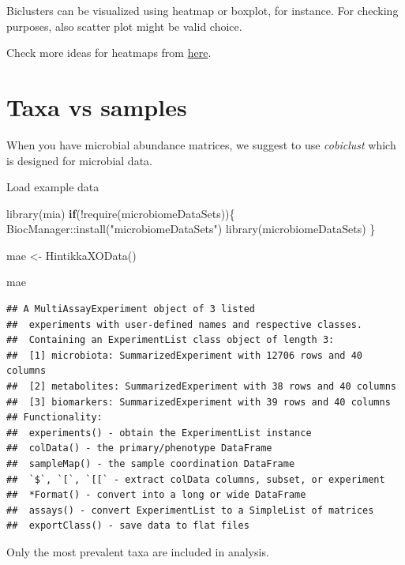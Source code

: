 \documentclass[
]{book}
\newenvironment{Shaded}{\begin{snugshade}}{\end{snugshade}}
\newcommand{\ControlFlowTok}[1]{\textcolor[rgb]{0.13,0.29,0.53}{\textbf{#1}}}
\newcommand{\FunctionTok}[1]{\textcolor[rgb]{0.00,0.00,0.00}{#1}}
\newcommand{\NormalTok}[1]{#1}
\newcommand{\OtherTok}[1]{\textcolor[rgb]{0.56,0.35,0.01}{#1}}
\newcommand{\SpecialCharTok}[1]{\textcolor[rgb]{0.00,0.00,0.00}{#1}}
\newcommand{\StringTok}[1]{\textcolor[rgb]{0.31,0.60,0.02}{#1}}
\begin{document}
Biclusters can be visualized using heatmap or boxplot, for instance. For checking purposes,
also scatter plot might be valid choice.

Check more ideas for heatmaps from
\href{https://microbiome.github.io/OMA/microbiome-community.html\#composition-heatmap}{here}.

\hypertarget{taxa-vs-samples}{%
\section{Taxa vs samples}\label{taxa-vs-samples}}

When you have microbial abundance matrices, we suggest to use \emph{cobiclust} which is
designed for microbial data.

Load example data

\begin{Shaded}
\begin{Highlighting}[]
\FunctionTok{library}\NormalTok{(mia)}
\ControlFlowTok{if}\NormalTok{(}\SpecialCharTok{!}\FunctionTok{require}\NormalTok{(microbiomeDataSets))\{}
\NormalTok{    BiocManager}\SpecialCharTok{::}\FunctionTok{install}\NormalTok{(}\StringTok{"microbiomeDataSets"}\NormalTok{)}
    \FunctionTok{library}\NormalTok{(microbiomeDataSets)}
\NormalTok{\}}

\NormalTok{mae }\OtherTok{\textless{}{-}} \FunctionTok{HintikkaXOData}\NormalTok{()}

\NormalTok{mae}
\end{Highlighting}
\end{Shaded}

\begin{verbatim}
## A MultiAssayExperiment object of 3 listed
##  experiments with user-defined names and respective classes.
##  Containing an ExperimentList class object of length 3:
##  [1] microbiota: SummarizedExperiment with 12706 rows and 40 columns
##  [2] metabolites: SummarizedExperiment with 38 rows and 40 columns
##  [3] biomarkers: SummarizedExperiment with 39 rows and 40 columns
## Functionality:
##  experiments() - obtain the ExperimentList instance
##  colData() - the primary/phenotype DataFrame
##  sampleMap() - the sample coordination DataFrame
##  `$`, `[`, `[[` - extract colData columns, subset, or experiment
##  *Format() - convert into a long or wide DataFrame
##  assays() - convert ExperimentList to a SimpleList of matrices
##  exportClass() - save data to flat files
\end{verbatim}

Only the most prevalent taxa are included in analysis.
\end{document}
